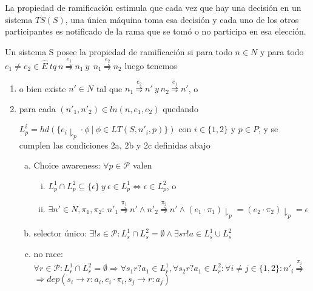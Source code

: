 La propiedad de ramificación estimula que cada vez que hay una decisión en un sistema $TS(S)$, una única máquina toma esa decisión y cada uno de los otros participantes es notificado de la rama que se tomó o no participa en esa elección. 
 
\begin{definition} Un sistema S posee la propiedad de ramificación si para todo $n \in N$ y para todo $e_1 \neq e_2 \in \hat{E} \ \mathit{tq} \ n \overset{e_1}{\rightrightharpoons} n_1 \ \mathit{y} \  \ n_1 \overset{e_2}{\rightrightharpoons} n_2$ luego tenemos
\begin{enumerate}
\item o bien existe $n'\in N$ tal que $n_1 \overset{e_2}{\rightrightharpoons} n' \ \mathit{y} \ n_2 \overset{e_1}{\rightrightharpoons} n'$, o 
\item para cada $(n'_1, n'_2) \in ln(n, e_1, e_2)$ quedando 

$L_p^i = hd (\{e_i \downharpoonright_p \cdot \phi \  | \ \phi \in LT(S,n'_i,p) \} ) $ con $i \in \{1,2\}$ y $p \in P$, y se cumplen las condiciones 2a, 2b y 2c definidas abajo 	

\begin{enumerate}[(a)]
\item Choice awareness: $\forall p \in \mathcal{P}$ valen \begin{enumerate}[i.]
\item $L_p^1 \cap	L_p^2 \subseteq \{ \epsilon \} \ \mathit{y} \  \epsilon \in L_p^1 \iff \epsilon \in L_p^2$, o 
\item $\exists n' \in N, \pi_1, \pi_2$: $n'_1 \overset{\pi_1}{\rightrightharpoons} n' \land  n'_2 \overset{\pi_2}{\rightrightharpoons} n' \land (e_1 \cdot \pi_1) \downharpoonright_p= (e_2 \cdot \pi_2)\downharpoonright_p = \epsilon$
\end{enumerate}
\item selector único: $\exists!s \in \mathcal{P}: L_s^1 \cap L_s^2 = \emptyset \land \exists sr!a \in L_s^1 \cup L_s^2 $
\item no race: $\forall r \in \mathcal{P}: L_r^1\cap L_r^2 = \emptyset \Rightarrow \forall s_1r?a_1 \in L_r^1, \forall s_2r?a_1 \in L_r^2:\forall i \neq j \in \{1,2\}: n'_i \overset{\pi_i}\rightrightharpoons  $ \\
$\Rightarrow dep (s_i \rightarrow r: a_i, e_i \cdot \pi_i, s_j \rightarrow r: a_j) $
\end{enumerate}
\end{enumerate} 	
\end{definition}

